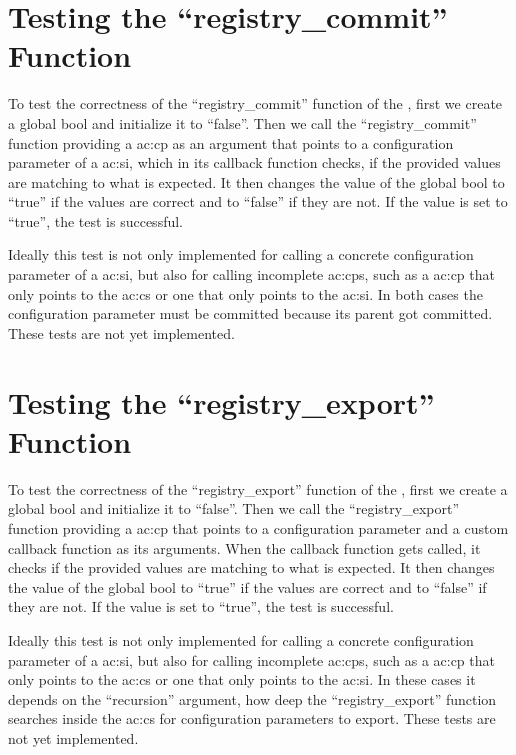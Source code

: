 \section{Testing the ``registry\_commit'' Function}

To test the correctness of the ``registry\_commit'' function of the , first we create a global bool and initialize it to ``false''. Then we call the ``registry\_commit'' function providing a \gls{ac:cp} as an argument that points to a configuration parameter of a \gls{ac:si}, which in its callback function checks, if the provided values are matching to what is expected. It then changes the value of the global bool to ``true'' if the values are correct and to ``false'' if they are not.
If the value is set to ``true'', the test is successful.

Ideally this test is not only implemented for calling a concrete configuration parameter of a \gls{ac:si}, but also for calling incomplete \glspl{ac:cp}, such as a \gls{ac:cp} that only points to the \gls{ac:cs} or one that only points to the \gls{ac:si}.
In both cases the configuration parameter must be committed because its parent got committed.
These tests are not yet implemented.

\section{Testing the ``registry\_export'' Function}

To test the correctness of the ``registry\_export'' function of the , first we create a global bool and initialize it to ``false''. Then we call the ``registry\_export'' function providing a \gls{ac:cp} that points to a configuration parameter and a custom callback function as its arguments. When the callback function gets called, it checks if the provided values are matching to what is expected. It then changes the value of the global bool to ``true'' if the values are correct and to ``false'' if they are not.
If the value is set to ``true'', the test is successful.

Ideally this test is not only implemented for calling a concrete configuration parameter of a \gls{ac:si}, but also for calling incomplete \glspl{ac:cp}, such as a \gls{ac:cp} that only points to the \gls{ac:cs} or one that only points to the \gls{ac:si}.
In these cases it depends on the ``recursion'' argument, how deep the ``registry\_export'' function searches inside the \gls{ac:cs} for configuration parameters to export.
These tests are not yet implemented.

